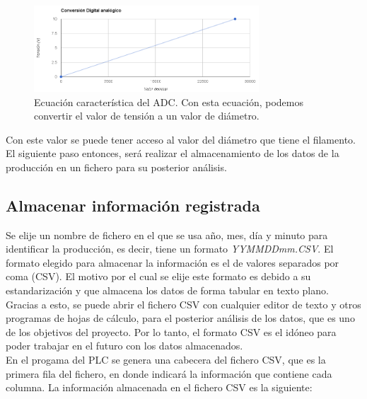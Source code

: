 \begin{figure}[H]
    \centering
    \includegraphics[width=0.75\textwidth]{images/PLC/image.png}
    \caption[Ecuación característica del ADC.]{Ecuación característica del ADC. Con esta ecuación, podemos convertir el valor de tensión a un valor de diámetro.} 
    \label{fig:plc_DAC}
\end{figure}

Con este valor se puede tener acceso al valor del diámetro que tiene el filamento. El siguiente paso entonces, será realizar el almacenamiento de los datos de la producción en un fichero para su posterior análisis.

\subsection{Almacenar información registrada}
\label{sec:plc_SD}

Se elije un nombre de fichero en el que se usa año, mes, día y minuto para identificar la producción, es decir, tiene un formato \textit{YYMMDDmm.CSV}. El formato elegido para almacenar la información es el de valores separados por coma (CSV). El motivo por el cual se elije este formato es debido a su estandarización y que almacena los datos de forma tabular en texto plano. Gracias a esto, se puede abrir el fichero CSV con cualquier editor de texto y otros programas de hojas de cálculo, para el posterior análisis de los datos, que es uno de los objetivos del proyecto. Por lo tanto, el formato CSV es el idóneo para poder trabajar en el futuro con los datos almacenados.\\

En el progama del PLC se genera una cabecera del fichero CSV, que es la primera fila del fichero, en donde indicará la información que contiene cada columna. La información almacenada en el fichero CSV es la siguiente:

